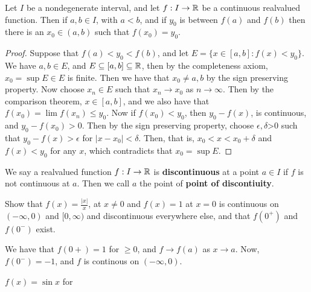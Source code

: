 \begin{theorem}\label{3.3.6}
    Let $I$ be a nondegenerate interval, and let  $f:I \rightarrow \mathbb{R}$ be a continuous realvalued 
    function. Then if  $a,b \in I$, with  $a<b$, and if  $y_0$ is between  $f(a)$ and  $f(b)$ 
    then there is an $x_0 \in (a,b)$ such that $f(x_0)=y_0$.
\end{theorem}
\begin{proof}
    Suppose that $f(a)<y_0<f(b)$, and let  $E=\{x \in [a,b]: f(x)<y_0\}$. We have
    $a,b \in E$, and  $E \subseteq [a,b]\subseteq \mathbb{R}$, then by the completeness axiom, 
    $x_0=\sup{E} \in E$ is finite. Then we have that $x_0 \neq a,b$ by the sign preserving 
    property. Now choose $x_n \in E$ such that  $x_n \rightarrow x_0$ as  $n \rightarrow \infty$. 
    Then by the comparison theorem,  $x \in [a,b]$, and we also have that 
    $f(x_0)=\lim{f(x_n)} \leq y_0$. Now if  $f(x_0)<y_0$, then  $y_0-f(x)$, is continuous, 
    and  $y_0-f(x_0)>0$. Then by the sign preserving property, choose  $\epsilon,\delta$>0 
    such that  $y_0-f(x)>\epsilon$ for $|x-x_0|< \delta$. Then, that is,  $x_0<x<x_0+\delta$ and 
    $f(x)<y_0$ for any  $x$, which contradicts that  $x_0=\sup{E}$.
\end{proof}

\begin{definition}
    We say a realvalued function $f:I \rightarrow \mathbb{R}$ is \textbf{discontinuous} 
    at a point $a \in I$ if  $f$ is not continuous at  $a$. Then we call  $a$ the point
    of \textbf{point of discontiuity}.
\end{definition}

\begin{example}
    Show that $f(x)=\frac{|x|}{x}$, at $x \neq 0$ and $f(x)=1$ at  $x=0$ is 
    continuous on  $(-\infty, 0)$ and  $[0, \infty)$ and discontinuous everywhere else, 
    and that $f(0^+)$ and  $f(0^-)$ exist.
\end{example} 
\begin{solution}
    We have that $f(0+)=1$ for  $ \geq 0$, and  $f \rightarrow f(a)$ as $x \rightarrow a$. 
    Now, $f(0^-)=-1$, and  $f$ is continous on  $(-\infty, 0)$.
\end{solution}
\begin{example}
    $f(x)=\sin{x}$ for 		
\end{example} 
